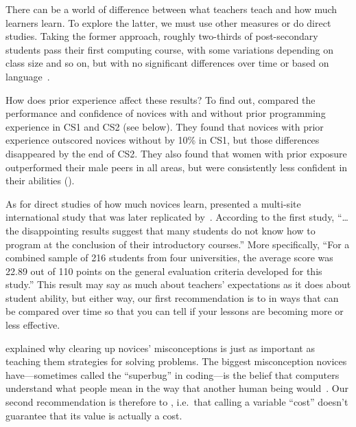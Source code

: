 \newpage
{}


There can be a world of difference between what teachers teach
and how much learners learn.
To explore the latter,
we must use other measures or do direct studies.
Taking the former approach,
roughly two-thirds of post-secondary students pass their first computing course,
with some variations depending on class size and so on,
but with no significant differences over time or based on language~\cite{Benn2007a,Wats2014}.

How does prior experience affect these results?
To find out,
\cite{Wilc2018} compared the performance and confidence of novices
with and without prior programming experience
in CS1 and CS2 (see below).
They found that novices with prior experience outscored novices without by 10\% in CS1,
but those differences disappeared by the end of CS2.
They also found that women with prior exposure outperformed their male peers in all areas,
but were consistently less confident in their abilities ().

As for direct studies of how much novices learn,
\cite{McCr2001} presented a multi-site international study
that was later replicated by~\cite{Utti2013}.
According to the first study,
``{\ldots}the disappointing results suggest that
many students do not know how to program at the conclusion of their introductory courses.''
More specifically,
``For a combined sample of 216 students from four universities,
the average score was 22.89 out of 110 points on the general evaluation criteria developed for this study.''
This result may say as much about teachers' expectations as it does about student ability,
but either way,
our first recommendation is to 
in ways that can be compared over time
so that you can tell if your lessons are becoming more or less effective.


 explained why clearing up novices' misconceptions
is just as important as teaching them strategies for solving problems.
The biggest misconception novices have---sometimes called the ``superbug'' in coding---is
the belief that computers understand what people mean in the way that another human being would~\cite{Pea1986}.
Our second recommendation is therefore to ,
i.e.\ that calling a variable ``cost'' doesn't guarantee that its value is actually a cost.

